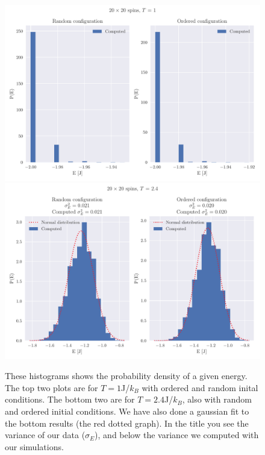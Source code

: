 \documentclass[reprint, english,notitlepage,nofootinbib]{revtex4-1}  %
\begin{document}
\begin{figure}[!htb]
	\includegraphics[width=16cm]{../output/de/L20-T1-dT0_0-NT1-N5-ProbE.pdf}
	\includegraphics[width=16cm]{../output/de/L20-T2_4-dT0_0-NT1-N5-ProbE.pdf}
	\caption{These histograms shows the probability density of a given energy. The top two plots are for $T = 1$J/$k_B$ with ordered and random inital conditions. The bottom two are for $T = 2.4$J/$k_B$, also with random and ordered initial conditions. We have also done a gaussian fit to the bottom results (the red dotted graph). In the title you see the variance of our data ($\sigma_E$), and below the variance we computed with our simulations.}
	\label{fig:L20_prob_dist}
\end{figure}
\end{document}

